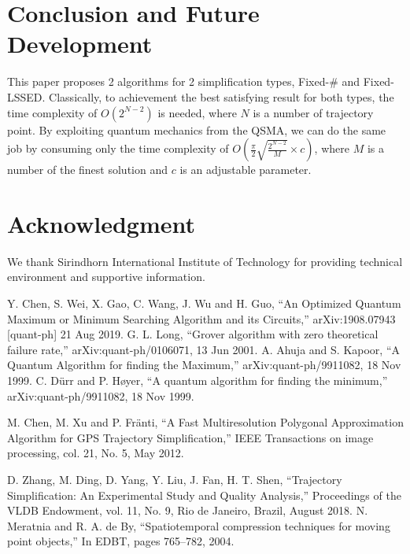 \documentclass[conference]{IEEEtran}
\begin{document}
	
	
	\section*{Conclusion and Future Development}

	This paper proposes 2 algorithms for 2 simplification types, Fixed-\# and Fixed-LSSED. Classically, to achievement the best satisfying result for both types, the time complexity of $O(2^{N-2})$ is needed, where $N$ is a number of trajectory point. By exploiting quantum mechanics from the QSMA, we can do the same job by consuming only the time complexity of $O(\frac{\pi}{2}\sqrt{\frac{2^{N-2}}{M}} \times c)$, where $M$ is a number of the finest solution and $c$ is an adjustable parameter.
	

	
	\section*{Acknowledgment}
	
	We thank Sirindhorn International Institute of Technology for providing technical environment and supportive information.
	
	
	
	
	\begin{thebibliography}{00}
		 Y. Chen, S. Wei, X. Gao, C. Wang, J. Wu and H. Guo, ``An Optimized Quantum Maximum or Minimum Searching Algorithm and its Circuits,'' arXiv:1908.07943 [quant-ph] 21 Aug 2019.
		 G. L. Long, ``Grover algorithm with zero theoretical failure rate,''	arXiv:quant-ph/0106071, 13 Jun 2001.
		 A. Ahuja and S. Kapoor, ``A Quantum Algorithm for finding the Maximum,''	arXiv:quant-ph/9911082, 18 Nov 1999.
		 C. Dürr and P. Høyer, ``A quantum algorithm for finding the minimum,''	arXiv:quant-ph/9911082, 18 Nov 1999.
		
		 M. Chen, M. Xu and P. Fränti, ``A Fast Multiresolution Polygonal
		Approximation Algorithm for GPS
		Trajectory Simplification,'' IEEE Transactions on image processing, col. 21, No. 5, May 2012.
		
		 D. Zhang, M. Ding, D. Yang, Y. Liu, J. Fan, H. T. Shen, ``Trajectory Simplification: An Experimental Study and Quality Analysis,'' Proceedings of the VLDB Endowment, vol. 11, No. 9, Rio de Janeiro, Brazil, August 2018.
		 N. Meratnia and R. A. de By, ``Spatiotemporal compression techniques for moving point objects,'' In EDBT, pages 765–782, 2004.
		
		
		
		
	\end{thebibliography}
	
\end{document}
